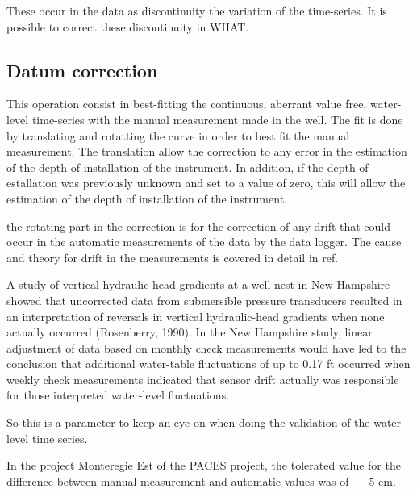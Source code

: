 \documentclass[WHATMANUAL.tex]{subfiles}
\begin{document}
These occur in the data as discontinuity the variation of the time-series. It is possible to correct these discontinuity in WHAT.

\subsection{Datum correction}

This operation consist in best-fitting the continuous, aberrant value free, water-level time-series with the manual measurement made in the well. The fit is done by translating and rotatting the curve in order to best fit the manual measurement. The translation allow the correction to any error in the estimation of the depth of installation of the instrument. In addition, if the depth of estallation was previously unknown and set to a value of zero, this will allow the estimation of the depth of installation of the instrument.

the rotating part in the correction is for the correction of any drift that could occur in the automatic measurements of the data by the data logger. The cause and theory for drift in the measurements is covered in detail in ref. 

A study of vertical hydraulic head gradients at a well nest in New Hampshire showed that uncorrected data from submersible pressure transducers resulted in an interpretation of reversals in vertical hydraulic-head gradients when none actually occurred (Rosenberry, 1990). In the New Hampshire study, linear adjustment of data based on monthly check measurements would have led to the conclusion that additional water-table fluctuations of up to 0.17 ft occurred when weekly check measurements indicated that sensor drift actually was responsible for those interpreted water-level fluctuations.

So this is a parameter to keep an eye on when doing the validation of the water level time series.

In the project Monteregie Est of the PACES project, the tolerated value for the difference between manual measurement and automatic values was of +- 5 cm.
\end{document}
